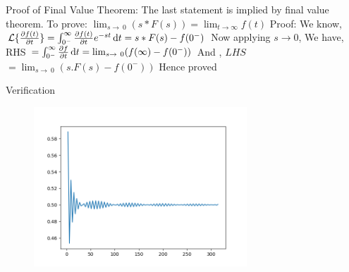 \documentclass{beamer}
\begin{document}
\begin{frame}{Proof of Final Value Theorem: }
The last statement is implied by final value theorem.
\newline
\newline
To prove: $\lim_{s\to\ 0} (s*F(s)) = \lim_{t\to\infty} f(t)$
\newline
\newline
Proof:
\newline
\newline
We know, 
$\mathcal{L}\{\pdv{f(t)}{t}\} = \int_{0^-}^{\infty} \pdv{f(t)}{t} e^{-st}\dd{t} =s*F(s)-f(0^{-}) $
\newline
\newline
Now applying $ s \to 0$, \hfill
\newline
\newline
We have,  RHS $=\int_{0^-}^{\infty} \pdv{f}{t}\dd{t} = \lim_{s\to\ 0}(f(\infty) - f(0^{-})) $
\newline
\newline
And ,  $LHS$ $= \lim_{s\to\ 0}(s.F(s)-f(0^{-}))$
\newline
Hence proved


\end{frame}

\begin{frame}{Verification}
\begin{figure}[h]
\includegraphics[width=8cm]{verification.png}
\end{figure}

    
\end{frame}
\end{document}
